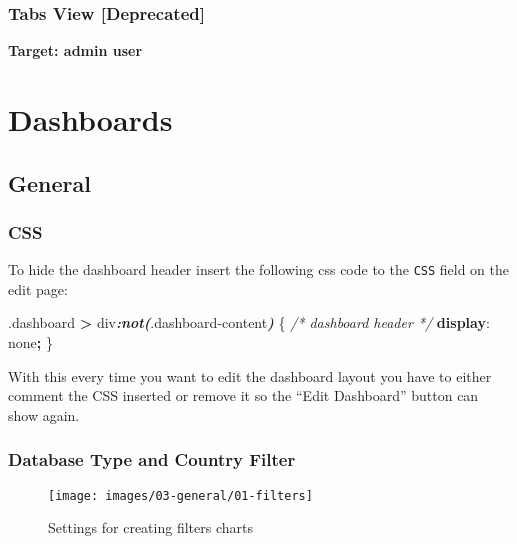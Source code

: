 \documentclass[
]{book}
\newenvironment{Shaded}{\begin{snugshade}}{\end{snugshade}}
\newcommand{\CommentTok}[1]{\textcolor[rgb]{0.56,0.35,0.01}{\textit{#1}}}
\newcommand{\DecValTok}[1]{\textcolor[rgb]{0.00,0.00,0.81}{#1}}
\newcommand{\FunctionTok}[1]{\textcolor[rgb]{0.00,0.00,0.00}{#1}}
\newcommand{\InformationTok}[1]{\textcolor[rgb]{0.56,0.35,0.01}{\textbf{\textit{#1}}}}
\newcommand{\KeywordTok}[1]{\textcolor[rgb]{0.13,0.29,0.53}{\textbf{#1}}}
\newcommand{\NormalTok}[1]{#1}
\newcommand{\OperatorTok}[1]{\textcolor[rgb]{0.81,0.36,0.00}{\textbf{#1}}}
\begin{document}
\hypertarget{tabs-view-deprecated}{%
\subsection*{Tabs View {[}Deprecated{]}}\label{tabs-view-deprecated}}

\textbf{Target: admin user}

\hypertarget{dashboards}{%
\chapter{Dashboards}\label{dashboards}}

\hypertarget{general}{%
\section{General}\label{general}}

\hypertarget{css}{%
\subsection*{CSS}\label{css}}

To hide the dashboard header insert the following css code to the \texttt{CSS} field on the edit page:

\begin{Shaded}
\begin{Highlighting}[]
\FunctionTok{.dashboard} \OperatorTok{\textgreater{}}\NormalTok{ div}\InformationTok{:not(}\FunctionTok{.dashboard{-}content}\InformationTok{)}\NormalTok{ \{  }\CommentTok{/* dashboard header */}
  \KeywordTok{display}\NormalTok{: }\DecValTok{none}\OperatorTok{;}
\NormalTok{\}}
\end{Highlighting}
\end{Shaded}

With this every time you want to edit the dashboard layout you have to either comment the CSS inserted
or remove it so the ``Edit Dashboard'' button can show again.

\hypertarget{database-type-and-country-filter}{%
\subsection*{Database Type and Country Filter}\label{database-type-and-country-filter}}

\begin{figure}
\texttt{[image: images/03-general/01-filters]} \caption{Settings for creating filters charts}\label{fig:filters}
\end{figure}
\end{document}
